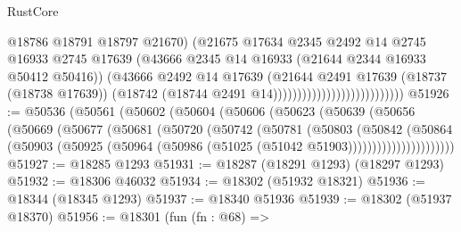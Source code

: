 \begin{lexlean}{RustCore}
\begin{coremodule}
                                                  @18786
                                                  @18791
                                                  @18797
                                                  @21670)
                                                (@21675
                                                  @17634
                                                  @2345
                                                  @2492
                                                  @14
                                                  @2745
                                                  @16933
                                                  @2745
                                                  @17639
                                                  (@43666
                                                    @2345
                                                    @14
                                                    @16933
                                                    (@21644 @2344 @16933 @50412 @50416))
                                                  (@43666
                                                    @2492
                                                    @14
                                                    @17639
                                                    (@21644
                                                      @2491
                                                      @17639
                                                      (@18737 (@18738 @17639))
                                                      (@18742
                                                        (@18744 @2491 @14)))))))))))))))))))))))))))
@51926 := @50536
    (@50561
      (@50602
        (@50604
          (@50606
            (@50623
              (@50639
                (@50656
                  (@50669
                    (@50677
                      (@50681
                        (@50720
                          (@50742
                            (@50781
                              (@50803
                                (@50842
                                  (@50864
                                    (@50903
                                      (@50925
                                        (@50964 (@50986 (@51025 (@51042 @51903))))))))))))))))))))))
@51927 := @18285 @1293
@51931 := @18287 (@18291 @1293) (@18297 @1293)
@51932 := @18306 @46032
@51934 := @18302 (@51932 @18321)
@51936 := @18344 (@18345 @1293)
@51937 := @18340 @51936
@51939 := @18302 (@51937 @18370)
@51956 := @18301
    (fun (fn : @68) =>

\end{coremodule}
\end{lexlean}
